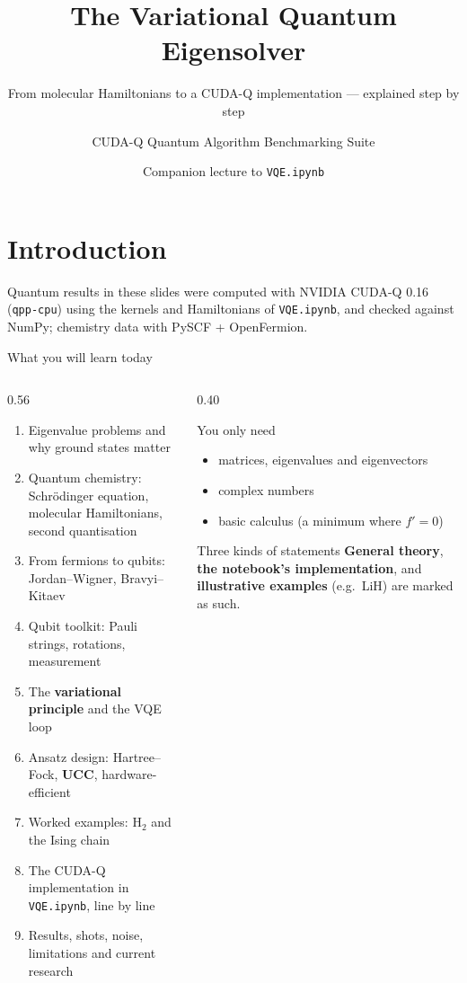 \documentclass[aspectratio=169,11pt]{beamer}
\title{The Variational Quantum Eigensolver}
\subtitle{From molecular Hamiltonians to a CUDA-Q implementation --- explained step by step}
\author{CUDA-Q Quantum Algorithm Benchmarking Suite}
\date{Companion lecture to \texttt{VQE.ipynb}}
\newcommand{\key}[1]{{\color{qdark}\textbf{#1}}}
\begin{document}
\section{Introduction}
\begin{frame}
  \titlepage
  \centering\small\color{qgrey}
  Quantum results in these slides were computed with NVIDIA CUDA-Q 0.16 (\texttt{qpp-cpu}) using the kernels and Hamiltonians of
  \texttt{VQE.ipynb}, and checked against NumPy; chemistry data with PySCF + OpenFermion.
\end{frame}

\begin{frame}{What you will learn today}
  \begin{columns}[T]
    \begin{column}{0.56\textwidth}
      \footnotesize
      \begin{enumerate}\itemsep0pt
        \item Eigenvalue problems and why ground states matter
        \item Quantum chemistry: Schr\"odinger equation, molecular Hamiltonians, second quantisation
        \item From fermions to qubits: Jordan--Wigner, Bravyi--Kitaev
        \item Qubit toolkit: Pauli strings, rotations, measurement
        \item The \key{variational principle} and the VQE loop
        \item Ansatz design: Hartree--Fock, \key{UCC}, hardware-efficient
        \item Worked examples: H$_2$ and the Ising chain
        \item The CUDA-Q implementation in \texttt{VQE.ipynb}, line by line
        \item Results, shots, noise, limitations and current research
      \end{enumerate}
    \end{column}
    \begin{column}{0.40\textwidth}
      \begin{block}{You only need}
        \begin{itemize}
          \item matrices, eigenvalues and eigenvectors
          \item complex numbers
          \item basic calculus (a minimum where $f' = 0$)
        \end{itemize}
      \end{block}
      \begin{alertblock}{Three kinds of statements}
        \small \textbf{General theory}, \textbf{the notebook's implementation}, and \textbf{illustrative examples} (e.g.\ LiH) are marked as such.
      \end{alertblock}
    \end{column}
  \end{columns}
\end{frame}
\end{document}

